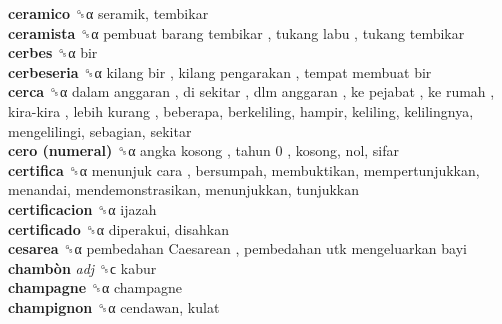 \textbf{ceramico} ␝α  seramik, tembikar  \\
\textbf{ceramista} ␝α   pembuat barang tembikar ,  tukang labu ,  tukang tembikar   \\
\textbf{cerbes} ␝α  bir  \\
\textbf{cerbeseria} ␝α   kilang bir ,  kilang pengarakan ,  tempat membuat bir   \\
\textbf{cerca} ␝α   dalam anggaran ,  di sekitar ,  dlm anggaran ,  ke pejabat ,  ke rumah ,  kira-kira ,  lebih kurang , beberapa, berkeliling, hampir, keliling, kelilingnya, mengelilingi, sebagian, sekitar  \\
\textbf{cero (numeral)} ␝α   angka kosong ,  tahun 0 , kosong, nol, sifar  \\
\textbf{certifica} ␝α   menunjuk cara , bersumpah, membuktikan, mempertunjukkan, menandai, mendemonstrasikan, menunjukkan, tunjukkan  \\
\textbf{certificacion} ␝α  ijazah  \\
\textbf{certificado} ␝α  diperakui, disahkan  \\
\textbf{cesarea} ␝α   pembedahan Caesarean ,  pembedahan utk mengeluarkan bayi   \\
\textbf{chambòn} \emph{adj}  ␝ϲ  kabur  \\
\textbf{champagne} ␝α  champagne  \\
\textbf{champignon} ␝α  cendawan, kulat  \\
